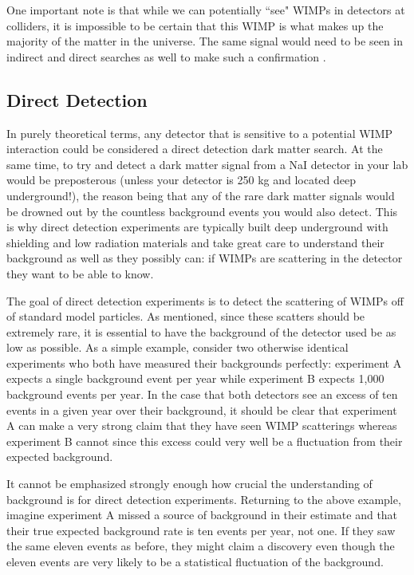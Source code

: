 One important note is that while we can potentially ``see" WIMPs in detectors at colliders,  it is impossible to be certain that this WIMP is what makes up the majority of the matter in the universe.  The same signal would need to be seen in indirect and direct searches as well to make such a confirmation \cite{queiroz2016dark}.


\subsection{Direct Detection}
\label{sec:dm_direct_detection}

In purely theoretical terms, any detector that is sensitive to a potential WIMP interaction could be considered a direct detection dark matter search.  At the same time, to try and detect a dark matter signal from a NaI detector in your lab would be preposterous (unless your detector is 250 kg and located deep underground!), the reason being that any of the rare dark matter signals would be drowned out by the countless background events you would also detect.  This is why direct detection experiments are typically built deep underground with shielding and low radiation materials and take great care to understand their background as well as they possibly can: if WIMPs are scattering in the detector they want to be able to know.

The goal of direct detection experiments is to detect the scattering of WIMPs off of standard model particles.  As mentioned, since these scatters should be extremely rare, it is essential to have the background of the detector used be as low as possible.  As a simple example, consider two otherwise identical experiments who both have measured their backgrounds perfectly: experiment A expects a single background event per year while experiment B expects 1,000 background events per year.  In the case that both detectors see an excess of ten events in a given year over their background, it should be clear that experiment A can make a very strong claim that they have seen WIMP scatterings whereas experiment B cannot since this excess could very well be a fluctuation from their expected background.

It cannot be emphasized strongly enough how crucial the understanding of background is for direct detection experiments.  Returning to the above example, imagine experiment A missed a source of background in their estimate and that their true expected background rate is ten events per year, not one.  If they saw the same eleven events as before, they might claim a discovery even though the eleven events are very likely to be a statistical fluctuation of the background.


